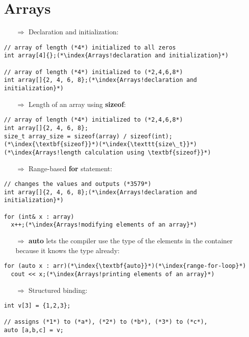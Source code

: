 \documentclass[10pt]{article}
\begin{document}
\section{Arrays}
\small
\begin{enumerate}
\item[$\Rightarrow$] Declaration and initialization:
\end{enumerate}
\begin{lstlisting}
// array of length (*4*) initialized to all zeros
int array[4]{};(*\index{Arrays!declaration and initialization}*)

// array of length (*4*) initialized to (*2,4,6,8*)
int array[]{2, 4, 6, 8};(*\index{Arrays!declaration and initialization}*)
\end{lstlisting}
\begin{enumerate}
\item[$\Rightarrow$] Length of an array using \textbf{sizeof}:
\end{enumerate}
\begin{lstlisting}
// array of length (*4*) initialized to (*2,4,6,8*)
int array[]{2, 4, 6, 8};
size_t array_size = sizeof(array) / sizeof(int);(*\index{\textbf{sizeof}}*)(*\index{\texttt{size\_t}}*)(*\index{Arrays!length calculation using \textbf{sizeof}}*)
\end{lstlisting}
\begin{enumerate}
\item[$\Rightarrow$] Range-based \textbf{for} statement:
\end{enumerate}
\begin{lstlisting}
// changes the values and outputs (*3579*)
int array[]{2, 4, 6, 8};(*\index{Arrays!declaration and initialization}*)

for (int& x : array)
  x++;(*\index{Arrays!modifying elements of an array}*)
\end{lstlisting}
\begin{enumerate}
\item[$\Rightarrow$] \textbf{auto} lets the compiler use the type of the elements in the container because it knows the type already:
\end{enumerate}
\begin{lstlisting}
for (auto x : arr)(*\index{\textbf{auto}}*)(*\index{range-for-loop}*)
  cout << x;(*\index{Arrays!printing elements of an array}*)
\end{lstlisting}
\begin{enumerate}
\item[$\Rightarrow$] Structured binding:
\end{enumerate}
\begin{lstlisting}
int v[3] = {1,2,3};

// assigns (*1*) to (*a*), (*2*) to (*b*), (*3*) to (*c*), 
auto [a,b,c] = v;
\end{lstlisting}
%
%
\end{document}
